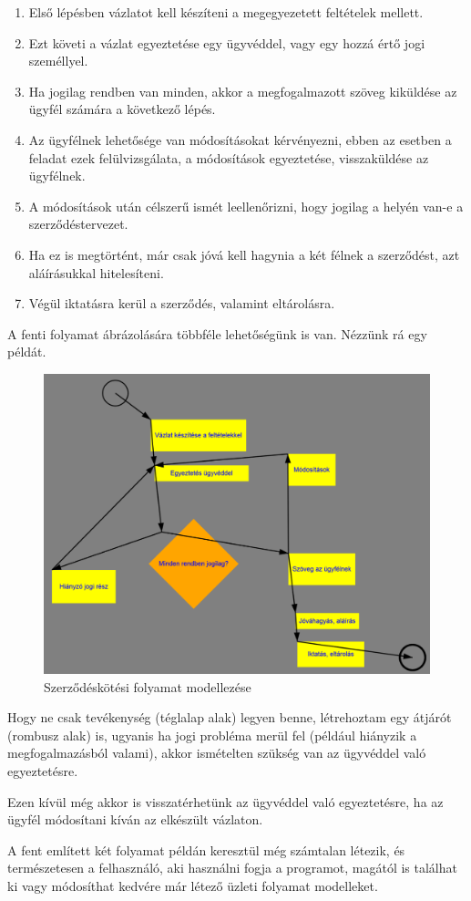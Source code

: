 \begin{enumerate}
\item Első lépésben vázlatot kell készíteni a megegyezetett feltételek mellett.
\item Ezt követi a vázlat egyeztetése egy ügyvéddel, vagy egy hozzá értő jogi személlyel.
\item Ha jogilag rendben van minden, akkor a megfogalmazott szöveg kiküldése az ügyfél számára a következő lépés.
\item Az ügyfélnek lehetősége van módosításokat kérvényezni, ebben az esetben a feladat ezek felülvizsgálata, a módosítások egyeztetése, visszaküldése az ügyfélnek.
\item A módosítások után célszerű ismét leellenőrizni, hogy jogilag a helyén van-e a szerződéstervezet.
\item Ha ez is megtörtént, már csak jóvá kell hagynia a két félnek a szerződést, azt aláírásukkal hitelesíteni.
\item Végül iktatásra kerül a szerződés, valamint eltárolásra.
\end{enumerate}
A fenti folyamat ábrázolására többféle lehetőségünk is van. Nézzünk rá egy példát.

\begin{figure}[h]
\centering
\includegraphics[scale=0.5]{images/pelda2NEMVEGLEGES.png}
\caption{Szerződéskötési folyamat modellezése}
\label{fig:bpmn2}
\end{figure}

Hogy ne csak tevékenység (téglalap alak) legyen benne, létrehoztam egy átjárót (rombusz alak) is, ugyanis ha jogi probléma merül fel (például hiányzik a megfogalmazásból valami), akkor ismételten szükség van az ügyvéddel való egyeztetésre.

Ezen kívül még akkor is visszatérhetünk az ügyvéddel való egyeztetésre, ha az ügyfél módosítani kíván az elkészült vázlaton.

A fent említett két folyamat példán keresztül még számtalan létezik, és természetesen a felhasználó, aki használni fogja a programot, magától is találhat ki vagy módosíthat kedvére már létező üzleti folyamat modelleket.